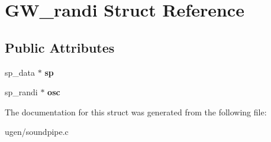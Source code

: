 \hypertarget{structGW__randi}{}\section{G\+W\+\_\+randi Struct Reference}
\label{structGW__randi}
\subsection*{Public Attributes}
\begin{DoxyCompactItemize}
\item 
\hypertarget{structGW__randi_a9e7103786ca261224e36384e9c7e911f}{}\label{structGW__randi_a9e7103786ca261224e36384e9c7e911f} 
sp\+\_\+data $\ast$ {\bfseries sp}
\item 
\hypertarget{structGW__randi_a48d7e19d71f745f51017242fd4e733e4}{}\label{structGW__randi_a48d7e19d71f745f51017242fd4e733e4} 
sp\+\_\+randi $\ast$ {\bfseries osc}
\end{DoxyCompactItemize}


The documentation for this struct was generated from the following file\+:\begin{DoxyCompactItemize}
\item 
ugen/soundpipe.\+c\end{DoxyCompactItemize}
